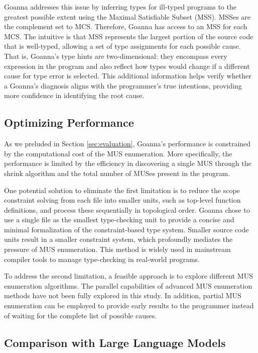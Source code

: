 \documentclass[pdflatex,lineno,sn-nature,Numbered]{sn-jnl}%
\begin{document}
Goanna addresses this issue by inferring types for ill-typed programs to the greatest possible extent using the Maximal Satisfiable Subset (MSS). MSSes are the complement set to MCS. Therefore, Goanna has access to an MSS for each MCS. The intuitive is that MSS represents the largest portion of the source code that is well-typed, allowing a set of type assignments for each possible cause. That is, Goanna's type hints are two-dimensional: they encompass every expression in the program and also reflect how types would change if a different cause for type error is selected. This additional information helps verify whether a Goanna's diagnosis aligns with the programmer's true intentions, providing more confidence in identifying the root cause.

\subsection{Optimizing Performance}

As we preluded in Section \ref{sec:evaluation}, Goanna's performance is constrained by the computational cost of the MUS enumeration. More specifically, the performance is limited by the efficiency in discovering a single MUS through the shrink algorithm and the total number of MUSes present in the program. 

One potential solution to eliminate the first limitation is to reduce the scope constraint solving from each file into smaller units, such as top-level function definitions, and process these sequentially in topological order. Goanna chose to use a single file as the smallest type-checking unit to provide a concise and minimal formalization of the constraint-based type system.  Smaller source code units result in a smaller constraint system, which profoundly mediates the pressure of MUS enumeration. This method is widely used in mainstream compiler tools to manage type-checking in real-world programs. 

To address the second limitation, a feasible approach is to explore different MUS enumeration algorithms. The parallel capabilities of advanced MUS enumeration methods \cite{Zhao2016-bu, Bendik2020-pz} have not been fully explored in this study. In addition, partial MUS enumeration \cite{Previti2013-mr, Liffiton2016-xi} can be employed to provide early results to the programmer instead of waiting for the complete list of possible causes.


\subsection{Comparison with Large Language Models} \label{sec:llm}
    
\end{document}
